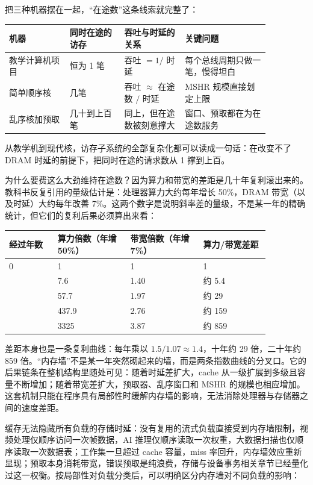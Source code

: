 把三种机器摆在一起，“在途数”这条线索就完整了：

\begin{longtable}{L{0.20\linewidth}L{0.18\linewidth}L{0.20\linewidth}L{0.28\linewidth}}
\toprule
机器 & 同时在途的访存 & 吞吐与时延的关系 & 关键问题 \\
\midrule
教学计算机项目 & 恒为 1 笔 & 吞吐 $=1/$ 时延 & 每个总线周期只做一笔，慢得坦白 \\\tablerowrule
简单顺序核 & 几笔 & 吞吐 $\approx$ 在途数 $/$ 时延 & MSHR 规模直接划定上限 \\\tablerowrule
乱序核加预取 & 几十到上百笔 & 同上，但在途数被刻意撑大 & 窗口、预取都在为在途数服务 \\
\bottomrule
\end{longtable}

从教学机到现代核，访存子系统的全部复杂化都可以读成一句话：在改变不了 DRAM 时延的前提下，把同时在途的请求数从 1 撑到上百。

为什么要费这么大劲维持在途数？因为算力和带宽的差距是几十年复利滚出来的。教科书反复引用的量级估计是：处理器算力大约每年增长 50\%，DRAM 带宽（以及时延）大约每年改善 7\%。这两个数字是说明斜率差的量级，不是某一年的精确统计，但它们的复利后果必须算出来看：

\begin{longtable}{L{0.16\linewidth}L{0.24\linewidth}L{0.24\linewidth}L{0.22\linewidth}}
\toprule
经过年数 & 算力倍数（年增 50\%） & 带宽倍数（年增 7\%） & 算力/带宽差距 \\
 & 1 & 1 & 1 \\ & 7.6 & 1.40 & 约 5.4 \\ & 57.7 & 1.97 & 约 29 \\ & 437.9 & 2.76 & 约 159 \\ & 3325 & 3.87 & 约 859 \\
\bottomrule
\end{longtable}

差距本身也是一条复利曲线：每年乘以 $1.5/1.07\approx1.4$，十年约 29 倍，二十年约 859 倍。“内存墙”不是某一年突然砌起来的墙，而是两条指数曲线的分叉口。它的后果链条在整机结构里随处可见：随着时延差扩大，cache 从一级扩展到多级且容量不断增加；随着带宽差扩大，预取器、乱序窗口和 MSHR 的规模也相应增加。这套机制只能在程序具有局部性时缓解内存墙的影响，无法消除处理器与存储器之间的速度差距。

缓存无法隐藏所有负载的存储时延：没有复用的流式负载直接受到内存墙限制，视频处理仅顺序访问一次帧数据，AI 推理仅顺序读取一次权重，大数据扫描也仅顺序读取一次数据表；工作集一旦超过 cache 容量，miss 率回升，内存墙效应重新显现；预取本身消耗带宽，错误预取是纯浪费，存储与设备事务相关章节已经量化过这一权衡。按局部性对负载分类后，可以明确区分内存墙对不同负载的影响：

